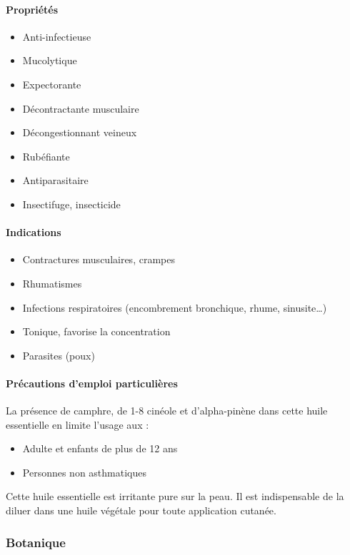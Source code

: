 \documentclass[12pt,a4wide]{article}
\begin{document}
\paragraph{Propriétés}
\label{sec-4-10-1-2}

\begin{itemize}
\item Anti-infectieuse
\item Mucolytique
\item Expectorante
\item Décontractante musculaire
\item Décongestionnant veineux
\item Rubéfiante
\item Antiparasitaire
\item Insectifuge, insecticide
\end{itemize}

\paragraph{Indications}
\label{sec-4-10-1-3}

\begin{itemize}
\item Contractures musculaires, crampes
\item Rhumatismes
\item Infections respiratoires (encombrement bronchique, rhume, sinusite…)
\item Tonique, favorise la concentration
\item Parasites (poux)
\end{itemize}

\paragraph{Précautions d'emploi particulières}
\label{sec-4-10-1-4}

La présence de camphre, de 1-8 cinéole et d'alpha-pinène dans cette huile essentielle en limite l'usage aux :
\begin{itemize}
\item Adulte et enfants de plus de 12 ans
\item Personnes non asthmatiques
\end{itemize}
Cette huile essentielle est irritante pure sur la peau. Il est indispensable de la diluer dans une huile végétale pour toute application cutanée.


\subsubsection{Botanique}
\label{sec-4-10-2}
\end{document}
